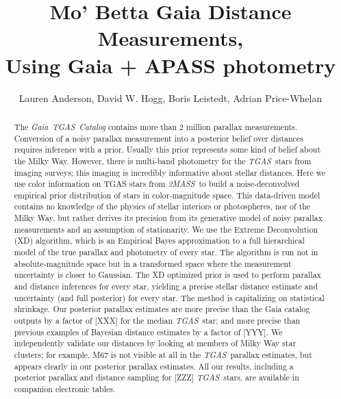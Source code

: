 \documentclass[iop]{emulateapj}
\newcommand{\acronym}[1]{{\small{#1}}}
\newcommand{\project}[1]{\textsl{#1}}
\newcommand{\tgas}{\project{\acronym{TGAS}}}
\newcommand{\tmass}{\project{\acronym{2MASS}}}
\newcommand{\gaia}{\project{Gaia}}
\begin{document}
\title{Mo' Betta Gaia Distance Measurements, \\
    Using Gaia + APASS photometry}

\author{Lauren Anderson,
        David W. Hogg,
        Boris Leistedt,
        Adrian Price-Whelan}

\begin{abstract}
The \gaia\ \tgas\ \project{Catalog} contains more than 2 million parallax measurements.
Conversion of a noisy parallax measurement into a posterior belief over distances requires inference with a prior.
Usually this prior represents some kind of belief about the Milky Way.
However, there is multi-band photometry for the \tgas\ stars from imaging surveys;
this imaging is incredibly informative about stellar distances.
Here we use color information on TGAS stars from \tmass\ to build a noise-deconvolved empirical prior distribution of stars in color-magnitude space.
This data-driven model contains no knowledge of the physics of stellar interiors or photospheres, nor of the Milky Way, but rather derives its precision from its generative model of noisy parallax measurements and an assumption of stationarity.
We use the Extreme Deconvolution (XD) algorithm, which is an Empirical Bayes approximation to a full hierarchical model of the true parallax and photometry of every star.
The algorithm is run not in absolute-magnitude space but in a transformed space where the measurement uncertainty is closer to Gaussian.
The XD optimized prior is used to perform parallax and distance inferences for every star, yielding a precise stellar distance estimate and uncertainty (and full posterior) for every star.
The method is capitalizing on statistical shrinkage.
Our posterior parallax estimates are more precise than the Gaia catalog outputs by a factor of [XXX] for the median \tgas\ star; and more precise than previous examples of Bayesian distance estimates by a factor of [YYY].
We independently validate our distances by looking at members of Milky Way star clusters; for example, M67 is not visible at all in the \tgas\ parallax estimates, but appears clearly in our posterior parallax estimates.
All our results, including a posterior parallax and distance sampling for [ZZZ] \tgas\ stars, are available in companion electronic tables.
\end{abstract}
\end{document}
